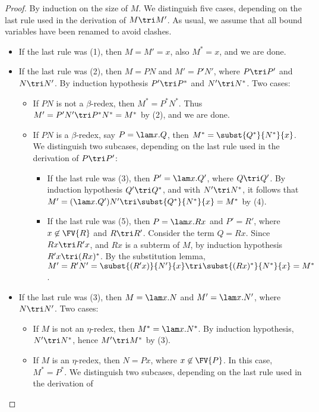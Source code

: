 \documentclass[12pt]{article}
\begin{document}
\begin{proof}
  By induction on the size of $M$. We distinguish five cases,
  depending on the last rule used in the derivation of $M \tri M'$.
  As usual, we assume that all bound variables have been renamed to
  avoid clashes.
  \begin{itemize}
  \item If the last rule was (1), then $M=M'=x$, also $M^*=x$, and we
    are done.
  \item If the last rule was (2), then $M=PN$ and $M'=P'N'$, where
    $P\tri P'$ and $N\tri N'$. By
    induction hypothesis $P'\tri P^*$ and $N'\tri N^*$. Two cases:
    \begin{itemize}
    \item If $PN$ is not a $\beta$-redex, then $M^*=P^*N^*$. Thus
      $M'=P'N'\tri P^*N^*=M^*$ by (2), and we are done.
    \item If $PN$ is a $\beta$-redex, say $P=\lam x.Q$, then
      $M^*=\subst{Q^*}{N^*}{x}$. We distinguish two subcases,
      depending on the last rule used in the derivation of $P\tri P'$:
      \begin{itemize} 
      \item If the last rule was (3), then $P'=\lam x.Q'$, where
        $Q\tri Q'$.  By induction hypothesis $Q' \tri Q^*$, and with
        $N' \tri N^*$, it follows that $M' = (\lam x.Q')N' \tri
        \subst{Q^*}{N^*}{x} = M^*$ by (4).
      \item If the last rule was (5), then $P=\lam x.Rx$ and $P'=R'$,
        where $x\not\in\FV{R}$ and $R\tri R'$. Consider the term
        $Q=Rx$.  Since $Rx \tri R'x$, and $Rx$ is a subterm of $M$, by
        induction hypothesis $R'x \tri (Rx)^*$. By the substitution
        lemma, $M' = R'N' = \subst{(R'x)}{N'}{x} \tri
        \subst{(Rx)^*}{N^*}{x} = M^*$.
      \end{itemize}
    \end{itemize}
  \item If the last rule was (3), then $M = \lam x.N$ and $M' = \lam
    x.N'$, where $N\tri N'$. Two cases:
    \begin{itemize}
    \item If $M$ is not an $\eta$-redex, then $M^*=\lam x.N^*$. By
      induction hypothesis, $N'\tri N^*$, hence $M'\tri M^*$ by (3).
    \item If $M$ is an $\eta$-redex, then $N=Px$, where
      $x\not\in\FV{P}$. In this case, $M^*=P^*$. We distinguish two
      subcases, depending on the last rule used in the derivation of

\end{itemize}
\end{itemize}
\end{proof}
\end{document}
